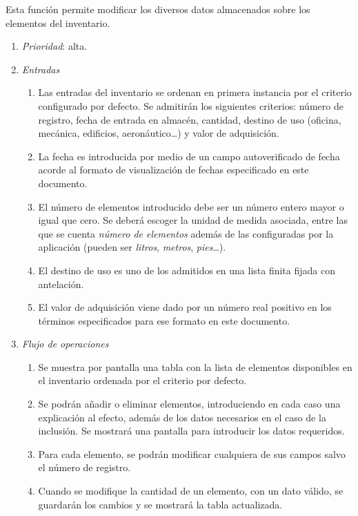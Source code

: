 

 \label{fun:modinventario}
	Esta función permite modificar los diversos datos almacenados sobre los elementos del inventario.

\begin{enumerate}
	\item \textit{Prioridad}: alta.
	\item \textit{Entradas}
	\begin{enumerate}
		\item Las entradas del inventario se ordenan en primera instancia por el criterio configurado por defecto. Se admitirán los siguientes criterios: número de registro, fecha de entrada en almacén, cantidad, destino de uso (oficina, mecánica, edificios, aeronáutico\ldots) y valor de adquisición.
		\item La fecha es introducida por medio de un campo autoverificado de fecha acorde al formato de visualización de fechas especificado en este documento.
		\item El número de elementos introducido debe ser un número entero mayor o igual que cero. Se deberá escoger la unidad de medida asociada, entre las que se cuenta \textit{número de elementos} además de las configuradas por la aplicación (pueden ser \textit{litros}, \textit{metros}, \textit{pies}\ldots).
		\item El destino de uso es uno de los admitidos en una lista finita fijada con antelación.
		\item El valor de adquisición viene dado por un número real positivo en los términos especificados para ese formato en este documento.	%
	\end{enumerate}
	\item \textit{Flujo de operaciones}
	\begin{enumerate}
		\item Se muestra por pantalla una tabla con la lista de elementos disponibles en el inventario ordenada por el criterio por defecto.
		\item Se podrán añadir o eliminar elementos, introduciendo en cada caso una explicación al efecto, además de los datos necesarios en el caso de la inclusión. Se mostrará una pantalla para introducir los datos requeridos.
		\item Para cada elemento, se podrán modificar cualquiera de sus campos salvo el número de registro.
		\item Cuando se modifique la cantidad de un elemento, con un dato válido, se guardarán los cambios y se mostrará la tabla actualizada.

\end{enumerate}
\end{enumerate}
